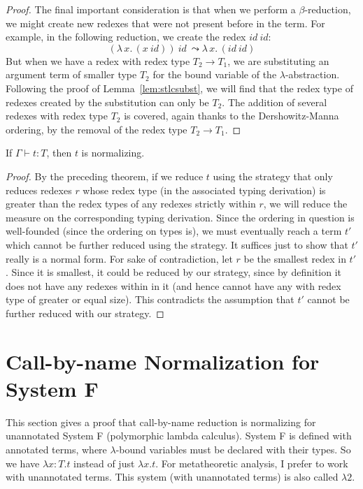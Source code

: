 \documentclass{article}
\begin{document}
\begin{proof}
  \noindent The final important consideration is that when we perform a $\beta$-reduction,
  we might create new redexes that were not present before in the term.  For example,
  in the following reduction, we create the redex $\textit{id}\ \textit{id}$:
  \[
  (\lambda\, x.\,(x\ \textit{id}))\ \textit{id} \ \leadsto
  \lambda\, x.\,(\textit{id} \ \textit{id})
  \]
  \noindent But when we have a redex with redex type $T_2\to T_1$, we are substituting
  an argument term of smaller type $T_2$ for the bound variable of the $\lambda$-abstraction.
  Following the proof of Lemma~\ref{lem:stlcsubst}, we will find that the redex type of
  redexes created by the substitution can only be $T_2$.  The addition of several redexes
  with redex type $T_2$ is covered, again thanks to the Dershowitz-Manna ordering, by the
  removal of the redex type $T_2 \to T_1$.
\end{proof}

\begin{corollary}
  If $\Gamma \vdash t : T$, then $t$ is normalizing.
\end{corollary}
\begin{proof} By the preceding theorem, if we reduce $t$ using the strategy
  that only reduces redexes $r$ whose redex type (in the associated typing derivation) is greater than the
  redex types of any redexes strictly within $r$, we will reduce the
  measure on the corresponding typing derivation.  Since the ordering
  in question is well-founded (since the ordering on types is), we
  must eventually reach a term $t'$ which cannot be further reduced
  using the strategy.  It suffices just to show that $t'$ really is a
  normal form.  For sake of contradiction, let $r$ be the smallest
  redex in $t'$.  Since it is smallest, it could be reduced by our
  strategy, since by definition it does not have any redexes within in
  it (and hence cannot have any with redex type of greater or equal
  size).  This contradicts the assumption that $t'$ cannot be further
  reduced with our strategy.
\end{proof}


\section{Call-by-name Normalization for System F}

This section gives a proof that call-by-name reduction is normalizing
for unannotated System F (polymorphic lambda calculus).  System F is
defined with annotated terms, where $\lambda$-bound variables must be
declared with their types.  So we have $\lambda x:T.t$ instead of just
$\lambda x.t$.  For metatheoretic analysis, I prefer to work with
unannotated terms.  This system (with unannotated terms) is also
called $\lambda2$.
\end{document}
